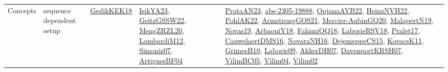 {\begin{longtable}{lp{3cm}>{\raggedright}p{6cm}>{\raggedright}p{6cm}p{8cm}}
Concepts & sequence dependent setup & \href{articles/GedikKEK18.pdf}{GedikKEK18}\cite{GedikKEK18} & \href{articles/IsikYA23.pdf}{IsikYA23}\cite{IsikYA23}, \href{papers/GeitzGSSW22.pdf}{GeitzGSSW22}\cite{GeitzGSSW22}, \href{articles/MengZRZL20.pdf}{MengZRZL20}\cite{MengZRZL20}, \href{articles/LombardiM12.pdf}{LombardiM12}\cite{LombardiM12}, \href{articles/Simonis07.pdf}{Simonis07}\cite{Simonis07}, \href{papers/ArtiguesBF04.pdf}{ArtiguesBF04}\cite{ArtiguesBF04} & \href{articles/PrataAN23.pdf}{PrataAN23}\cite{PrataAN23}, \href{articles/abs-2305-19888.pdf}{abs-2305-19888}\cite{abs-2305-19888}, \href{papers/OujanaAYB22.pdf}{OujanaAYB22}\cite{OujanaAYB22}, \href{articles/HeinzNVH22.pdf}{HeinzNVH22}\cite{HeinzNVH22}, \href{articles/PohlAK22.pdf}{PohlAK22}\cite{PohlAK22}, \href{papers/ArmstrongGOS21.pdf}{ArmstrongGOS21}\cite{ArmstrongGOS21}, \href{papers/Mercier-AubinGQ20.pdf}{Mercier-AubinGQ20}\cite{Mercier-AubinGQ20}, \href{papers/MalapertN19.pdf}{MalapertN19}\cite{MalapertN19}, \href{articles/Novas19.pdf}{Novas19}\cite{Novas19}, \href{papers/ArbaouiY18.pdf}{ArbaouiY18}\cite{ArbaouiY18}, \href{articles/FahimiOQ18.pdf}{FahimiOQ18}\cite{FahimiOQ18}, \href{articles/LaborieRSV18.pdf}{LaborieRSV18}\cite{LaborieRSV18}, \href{papers/Pralet17.pdf}{Pralet17}\cite{Pralet17}, \href{papers/CauwelaertDMS16.pdf}{CauwelaertDMS16}\cite{CauwelaertDMS16}, \href{articles/NovaraNH16.pdf}{NovaraNH16}\cite{NovaraNH16}, \href{papers/DejemeppeCS15.pdf}{DejemeppeCS15}\cite{DejemeppeCS15}, \href{articles/KovacsK11.pdf}{KovacsK11}\cite{KovacsK11}, \href{papers/GrimesH10.pdf}{GrimesH10}\cite{GrimesH10}, \href{papers/Laborie09.pdf}{Laborie09}\cite{Laborie09}, \href{papers/AkkerDH07.pdf}{AkkerDH07}\cite{AkkerDH07}, \href{papers/DavenportKRSH07.pdf}{DavenportKRSH07}\cite{DavenportKRSH07}, \href{articles/VilimBC05.pdf}{VilimBC05}\cite{VilimBC05}, \href{papers/Vilim04.pdf}{Vilim04}\cite{Vilim04}, \href{papers/Vilim02.pdf}{Vilim02}\cite{Vilim02}\\

\end{longtable}}
